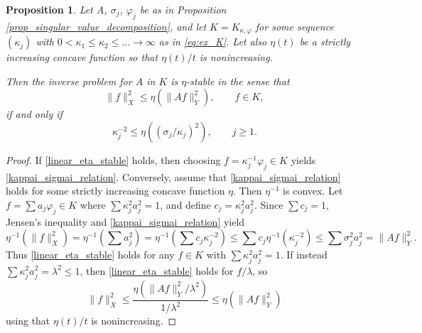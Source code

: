\documentclass[12pt,twoside]{amsart}
\numberwithin{equation}{section}
\renewcommand{\leq}{\leqslant}
\renewcommand{\geq}{\geqslant}
\newtheorem{proposition}[theorem]{Proposition}
\newcommand{\norm}[1]{\lVert #1 \rVert}         %
\begin{document}
\begin{appendix}
\begin{proposition} 
\label{lemma_holder_stability_abstract}
Let $A$, $\sigma_j$, $\varphi_j$ be as in Proposition \ref{prop_singular_value_decomposition}, and let $K = K_{\kappa,\varphi}$ for some sequence $(\kappa_j)$ with $0 < \kappa_1 \leq \kappa_2 \leq \ldots \to \infty$ as in \eqref{eq:ex_K}. Let also $\eta(t)$ be a strictly increasing concave function so that $\eta(t)/t$ is nonincreasing.

Then the inverse problem for $A$ in $K$ is $\eta$-stable in the sense that 
\begin{equation} \label{linear_eta_stable}
\norm{f}_X^2 \leq \eta(\norm{Af}_Y^2), \qquad f \in K,
\end{equation}
if and only if 
\begin{equation} \label{kappai_sigmai_relation}
\kappa_j^{-2} \leq \eta((\sigma_j/\kappa_j)^2), \qquad j \geq 1.
\end{equation}
\end{proposition}
\begin{proof}
If \eqref{linear_eta_stable} holds, then choosing $f = \kappa_j^{-1} \varphi_j \in K$ yields \eqref{kappai_sigmai_relation}. Conversely, assume that \eqref{kappai_sigmai_relation} holds for some strictly increasing concave function $\eta$. Then $\eta^{-1}$ is convex. Let $f = \sum a_j \varphi_j \in K$ where $\sum \kappa_j^2 a_j^2 = 1$, and define $c_j = \kappa_j^2 a_j^2$. Since $\sum c_j = 1$, Jensen's inequality and \eqref{kappai_sigmai_relation} yield 
\[
\eta^{-1}(\norm{f}_X^2) = \eta^{-1}(\sum a_j^2) = \eta^{-1}(\sum c_j \kappa_j^{-2}) \leq \sum c_j \eta^{-1}(\kappa_j^{-2}) \leq \sum \sigma_j^2 a_j^2 = \norm{Af}_Y^2.
\]
Thus \eqref{linear_eta_stable} holds for any $f \in K$ with $\sum \kappa_j^2 a_j^2 = 1$. If instead $\sum \kappa_j^2 a_j^2 = \lambda^2 \leq 1$, then \eqref{linear_eta_stable} holds for $f/\lambda$, so 
\[
\norm{f}_X^2 \leq \frac{\eta(\norm{Af}_Y^2/\lambda^2)}{1/\lambda^2} \leq \eta(\norm{Af}_Y^2)
\]
using that $\eta(t)/t$ is nonincreasing.
\end{proof}



\end{appendix}
\end{document}
